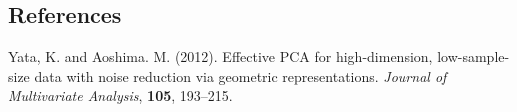 \documentclass[12pt]{article}
\begin{document}
%        
%
%        

\subsection*{References}

\begin{description}


\item
Yata, K. and Aoshima. M. (2012). 
Effective PCA for high-dimension, low-sample-size data with noise reduction via geometric representations. 
\textit{Journal of Multivariate Analysis},
\textbf{105}, 193--215. 

\end{description}
\end{document}
